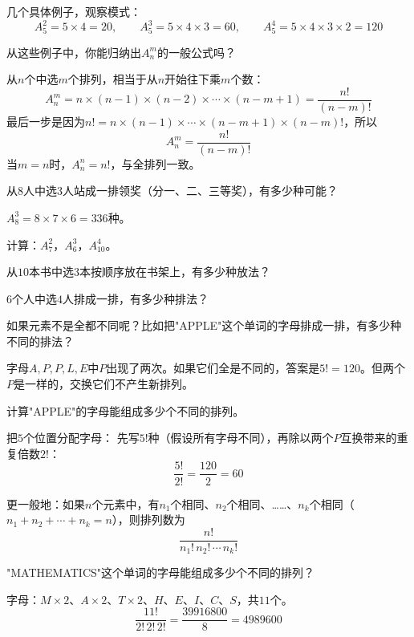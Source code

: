 几个具体例子，观察模式：
\[
A_5^2 = 5\times4 = 20,\qquad
A_5^3 = 5\times4\times3 = 60,\qquad
A_5^4 = 5\times4\times3\times2 = 120
\]

\begin{example}
从这些例子中，你能归纳出$A_n^m$的一般公式吗？
\end{example}
\begin{solution}
从$n$个中选$m$个排列，相当于从$n$开始往下乘$m$个数：
\[
A_n^m = n\times(n-1)\times(n-2)\times\cdots\times(n-m+1) = \frac{n!}{(n-m)!}
\]
最后一步是因为$n! = n\times(n-1)\times\cdots\times(n-m+1)\times(n-m)!$，所以
\[
A_n^m = \frac{n!}{(n-m)!}
\]
当$m=n$时，$A_n^n = n!$，与全排列一致。
\end{solution}

\begin{example}
从$8$人中选$3$人站成一排领奖（分一、二、三等奖），有多少种可能？
\end{example}
\begin{solution}
$A_8^3 = 8\times7\times6 = 336$种。
\end{solution}

\begin{exercise}
\item 计算：$A_7^2$，$A_6^3$，$A_{10}^4$。
\item 从$10$本书中选$3$本按顺序放在书架上，有多少种放法？
\item $6$个人中选$4$人排成一排，有多少种排法？
\end{exercise}


如果元素不是全都不同呢？比如把"APPLE"这个单词的字母排成一排，有多少种不同的排法？

字母$A,P,P,L,E$中$P$出现了两次。如果它们全是不同的，答案是$5! = 120$。但两个$P$是一样的，交换它们不产生新排列。

\begin{example}
计算"APPLE"的字母能组成多少个不同的排列。
\end{example}
\begin{solution}
把$5$个位置分配字母：
先写$5!$种（假设所有字母不同），再除以两个$P$互换带来的重复倍数$2!$：
\[
\frac{5!}{2!} = \frac{120}{2} = 60
\]
\end{solution}

更一般地：如果$n$个元素中，有$n_1$个相同、$n_2$个相同、……、$n_k$个相同（$n_1+n_2+\cdots+n_k=n$），则排列数为
\[
\frac{n!}{n_1!\,n_2!\,\cdots\,n_k!}
\]

\begin{example}
"MATHEMATICS"这个单词的字母能组成多少个不同的排列？
\end{example}
\begin{solution}
字母：$M\times2$、$A\times2$、$T\times2$、$H$、$E$、$I$、$C$、$S$，共$11$个。
\[
\frac{11!}{2!\,2!\,2!} = \frac{39916800}{8} = 4989600
\]
\end{solution}

